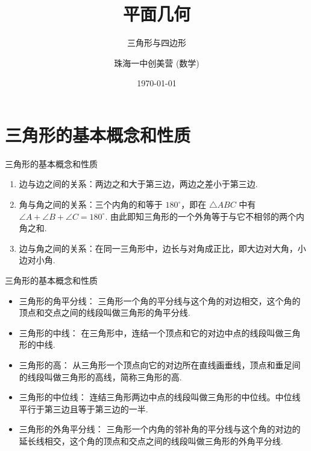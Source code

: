 \documentclass[aspectratio=169]{ctexbeamer}
\title[三角形与四边形]{平面几何}
\subtitle{三角形与四边形}
\author[珠海一中创美营]{珠海一中创美营 (数学) }
\date[\today]{\today}
\theoremstyle{definition}
\begin{document}
\frame{\titlepage}
\section{三角形的基本概念和性质}
\begin{frame}{三角形的基本概念和性质}
	\begin{enumerate}
		\item 边与边之间的关系：两边之和大于第三边，两边之差小于第三边.
		\item 角与角之间的关系：三个内角的和等于 $180^{\circ}$，即在 $\triangle A B C$ 中有 $\angle A+\angle B+\angle C=180^{\circ}$. 由此即知三角形的一个外角等于与它不相邻的两个内角之和.
		\item 边与角之间的关系：在同一三角形中，边长与对角成正比，即大边对大角，小边对小角.
	\end{enumerate}
\end{frame}

\begin{frame}{三角形的基本概念和性质}
	\begin{itemize}
		\item {\color{blue!50!black}三角形的角平分线：} 三角形一个角的平分线与这个角的对边相交，这个角的顶点和交点之间的线段叫做三角形的角平分线.
		\item {\color{blue!50!black}三角形的中线：} 在三角形中，连结一个顶点和它的对边中点的线段叫做三角形的中线.
		\item {\color{blue!50!black}三角形的高：} 从三角形一个顶点向它的对边所在直线画垂线，顶点和垂足间的线段叫做三角形的高线，简称三角形的高.
		\item {\color{blue!50!black}三角形的中位线：} 连结三角形两边中点的线段叫做三角形的中位线。中位线平行于第三边且等于第三边的一半.
		\item {\color{blue!50!black}三角形的外角平分线：} 三角形一个内角的邻补角的平分线与这个角的对边的延长线相交，这个角的顶点和交点之间的线段叫做三角形的外角平分线.
	\end{itemize}
\end{frame}
\end{document}
